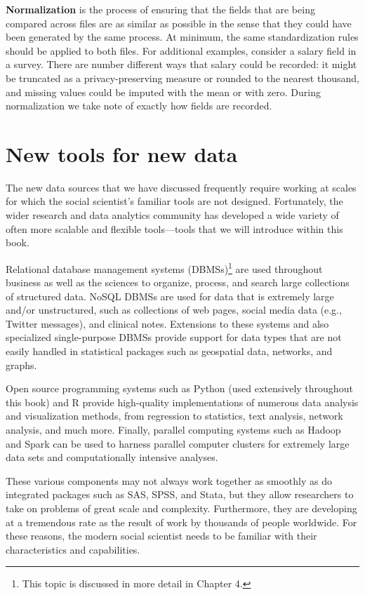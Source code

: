 \documentclass[]{krantz}
\begin{document}
\textbf{Normalization} is the process of ensuring that the fields that
are being compared across files are as similar as possible in the sense
that they could have been generated by the same process. At minimum, the
same standardization rules should be applied to both files. For
additional examples, consider a salary field in a survey. There are
number different ways that salary could be recorded: it might be
truncated as a privacy-preserving measure or rounded to the nearest
thousand, and missing values could be imputed with the mean or with
zero. During normalization we take note of exactly how fields are
recorded.

\section{New tools for new data}\label{new-tools-for-new-data}

The new data sources that we have discussed frequently require working
at scales for which the social scientist's familiar tools are not
designed. Fortunately, the wider research and data analytics community
has developed a wide variety of often more scalable and flexible
tools---tools that we will introduce within this book.

Relational database management systems (DBMSs)\footnote{This topic is
  discussed in more detail in Chapter 4.} are used throughout business
as well as the sciences to organize, process, and search large
collections of structured data. NoSQL DBMSs are used for data that is
extremely large and/or unstructured, such as collections of web pages,
social media data (e.g., Twitter messages), and clinical notes.
Extensions to these systems and also specialized single-purpose DBMSs
provide support for data types that are not easily handled in
statistical packages such as geospatial data, networks, and graphs.

Open source programming systems such as Python (used extensively
throughout this book) and R provide high-quality implementations of
numerous data analysis and visualization methods, from regression to
statistics, text analysis, network analysis, and much more. Finally,
parallel computing systems such as Hadoop and Spark can be used to
harness parallel computer clusters for extremely large data sets and
computationally intensive analyses.

These various components may not always work together as smoothly as do
integrated packages such as SAS, SPSS, and Stata, but they allow
researchers to take on problems of great scale and complexity.
Furthermore, they are developing at a tremendous rate as the result of
work by thousands of people worldwide. For these reasons, the modern
social scientist needs to be familiar with their characteristics and
capabilities.
\end{document}
